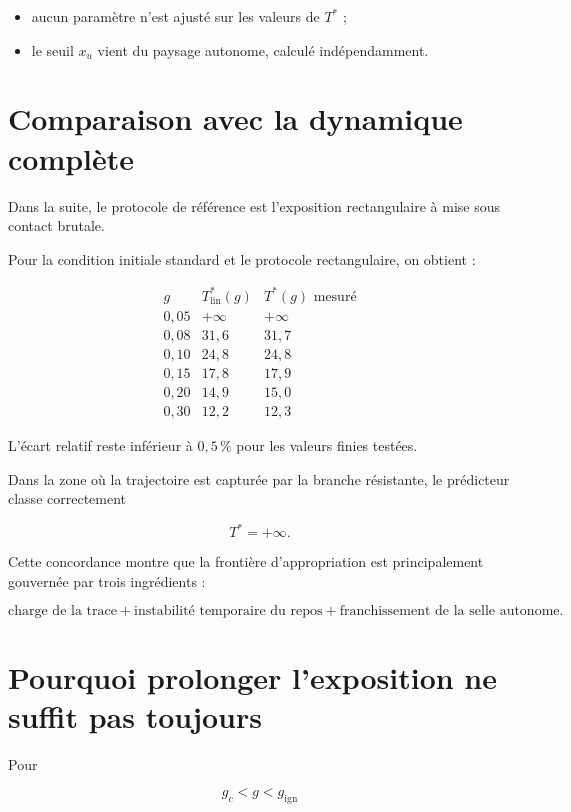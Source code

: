 \begin{itemize}
\item
  aucun paramètre n'est ajusté sur les valeurs de \(T^\ast\) ;
\item
  le seuil \(x_u\) vient du paysage autonome, calculé indépendamment.
\end{itemize}

\section{Comparaison avec la dynamique complète}
\label{annexe-resistance-comparaison-Tstar}

Dans la suite, le protocole de référence est l'exposition rectangulaire à
mise sous contact brutale.

Pour la condition initiale standard et le protocole rectangulaire, on
obtient :

\[
\begin{array}{c|cc}
g
&
T_{\mathrm{lin}}^\ast(g)
&
T^\ast(g)\text{ mesuré}
\\
\hline
0{,}05
&
+\infty
&
+\infty
\\
0{,}08
&
31{,}6
&
31{,}7
\\
0{,}10
&
24{,}8
&
24{,}8
\\
0{,}15
&
17{,}8
&
17{,}9
\\
0{,}20
&
14{,}9
&
15{,}0
\\
0{,}30
&
12{,}2
&
12{,}3
\end{array}
\]

L'écart relatif reste inférieur à \(0{,}5\,\%\) pour les valeurs
finies testées.

Dans la zone où la trajectoire est capturée par la branche résistante,
le prédicteur classe correctement

\[
T^\ast=+\infty.
\]

Cette concordance montre que la frontière d'appropriation est
principalement gouvernée par trois ingrédients :

\[
\boxed{
\text{charge de la trace}
+
\text{instabilité temporaire du repos}
+
\text{franchissement de la selle autonome}.
}
\]

\section{Pourquoi prolonger l'exposition ne suffit pas toujours}
\label{annexe-resistance-prolonger-exposition}

Pour

\[
g_c<g<g_{\mathrm{ign}}
\]

